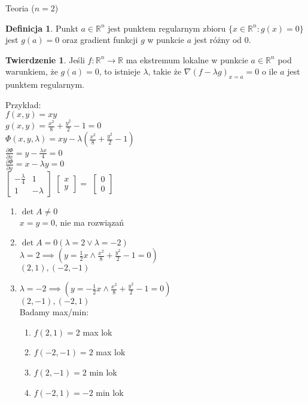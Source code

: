 \documentclass{article}
\theoremstyle{definition}
\newtheorem{de}{Definicja}[subsection]
\theoremstyle{definition}
\newtheorem{tw}{Twierdzenie}[subsection]
\theoremstyle{definition}
\theoremstyle{definition}
\begin{document}
Teoria ($n=2$)
\begin{de}
    Punkt $a\in\mathbb{R}^n$ jest punktem regularnym zbioru $\{x\in\mathbb{R}^n:  g(x)=0\}$ jest $g(a)=0$ oraz gradient funkcji $g$ w punkcie $a$ jest różny od $0$.
\end{de}

\begin{tw}
    Jeśli $f:\mathbb{R}^n\rightarrow\mathbb{R}$ ma ekstremum lokalne w punkcie $a\in\mathbb{R}^n$ pod warunkiem, że $g(a)=0$, to istnieje
    $\lambda$, takie że $\nabla(f - \lambda g)_{x=a} = 0$ o ile $a$ jest punktem regularnym.
\end{tw}

Przykład:\\
$f(x,y)=xy$\\
$g(x,y)=\frac{x^2}{8}+\frac{y^2}{2}-1=0$\\
$\Phi(x,y,\lambda) = xy - \lambda (\frac{x^2}{8} + \frac{y^2}{2}-1)$\\
$\frac{\partial \Phi}{\partial x} = y - \frac{\lambda x}{4} =0$\\
$\frac{\partial \Phi}{\partial y} = x - \lambda y = 0 $\\
$\begin{bmatrix}
-\frac{\lambda}{4} & 1\\
1 & -\lambda
\end{bmatrix}$
$\begin{bmatrix}
    x\\
    y
\end{bmatrix}
=
$
$
\begin{bmatrix}
0\\
0
\end{bmatrix}$\\
\begin{enumerate}
    \item $\det A \neq 0$\\
    $x=y=0$, nie ma rozwiązań
    \item $\det A = 0 \left(\lambda = 2 \lor \lambda = -2\right)$\\
    $\lambda = 2 \implies \left(y=\frac{1}{2} x \land \frac{x^2}{8} + \frac{y^2}{2} - 1 =0\right)$\\
    $\left(2,1\right), \left(-2,-1\right)$\\
    \item $\lambda = -2 \implies \left(y=-\frac{1}{2}x \land \frac{x^2}{8}+\frac{y^2}{2} - 1 = 0\right)$\\
    $\left(2,-1\right), \left(-2,1\right)$\\
    Badamy max/min:
    \begin{enumerate}
        \item $f(2,1)=2$ max lok
        \item $f(-2,-1)=2$ max lok
        \item $f(2,-1)=2$ min lok
        \item $f(-2,1)=-2$ min lok
    \end{enumerate}
\end{enumerate}
\end{document}
